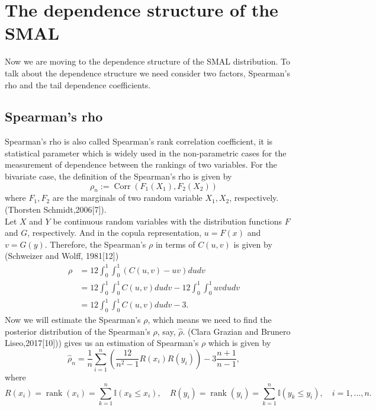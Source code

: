 \documentclass[mstat,12pt]{unswthesis}  %
\numberwithin{equation}{section}
\begin{document}
\chapter{The dependence structure of the SMAL}\label{cha}
Now we are moving to the dependence structure of the SMAL distribution. To talk about the dependence structure we need consider two factors, Spearman's rho and the tail dependence coefficients.

\section{Spearman's rho}
Spearman's rho is also called Spearman's rank correlation coefficient, it is statistical parameter which is widely used in the non-parametric cases for the measurement of dependence between the rankings of two variables. For the bivariate case, the definition of the Spearman's rho is given by 
\begin{equation}
\rho_n:=\operatorname{Corr}\left(F_{1}\left(X_{1}\right), F_{2}\left(X_{2}\right)\right)
\end{equation}
where $F_1, F_2$ are the marginals of two random variable $X_1,X_2$, respectively.(Thorsten Schmidt,2006[7]).\\
Let $X$ and $Y$ be continuous random variables with the distribution functions $F$ and $G$, respectively. And in the copula representation, $u = F(x)$ and $v = G(y)$. Therefore, the Spearman's $\rho$ in terms of $C(u,v)$ is given by (Schweizer and Wolff, 1981[12])
\begin{equation}
\begin{split}
\rho &=12 \int_{0}^{1} \int_{0}^{1}(C(u, v)-u v) d u d v\\
& = 12 \int_{0}^{1} \int_{0}^{1}C(u, v)d u d v -12 \int_{0}^{1} \int_{0}^{1}u v d u d v\\
& = 12 \int_{0}^{1} \int_{0}^{1}C(u, v)d u d v - 3.
\end{split}
\end{equation}
Now we will estimate the Spearman's $\rho$, which means we need to find the posterior distribution of the Spearman's $\rho$, say, $\hat{\rho}$.
(Clara Grazian and Brunero Liseo,2017[10])) gives us an estimation of Spearman's $\rho$ which is given by
\begin{equation}
\hat{\rho}_{n}=\frac{1}{n} \sum_{i=1}^{n}\left(\frac{12}{n^{2}-1} R(x_i) R(y_i)\right)-3 \frac{n+1}{n-1},
\end{equation}
where 
\begin{equation}
R(x_i)=\operatorname{rank}\left(x_{i}\right)=\sum_{k=1}^{n} \mathbb{I}\left(x_{k} \leq x_{i}\right), \quad R(y_i)=\operatorname{rank}\left(y_{i}\right)=\sum_{k=1}^{n} \mathbb{I}\left(y_{k} \leq y_{i}\right), \quad i=1, \ldots, n.
\end{equation}
\end{document}
